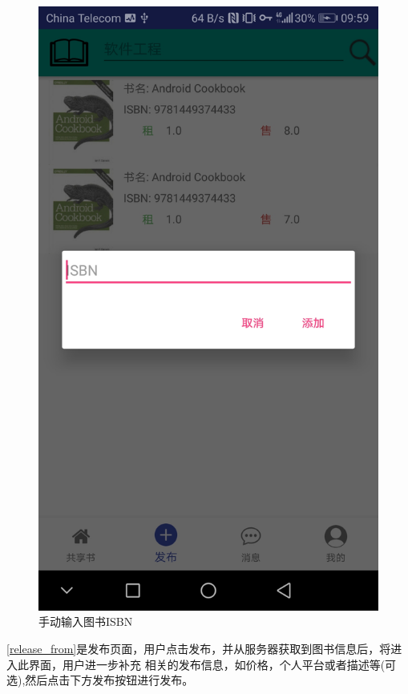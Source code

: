 \begin{figure}[h]
	\centering
	\includegraphics[scale=0.09]{Chapters/UI/input_isbn.jpg}
	\caption{手动输入图书ISBN}
	\label{input_isbn}
\end{figure}


\cref{release_from}是发布页面，用户点击发布，并从服务器获取到图书信息后，将进入此界面，用户进一步补充
相关的发布信息，如价格，个人平台或者描述等(可选),然后点击下方发布按钮进行发布。

